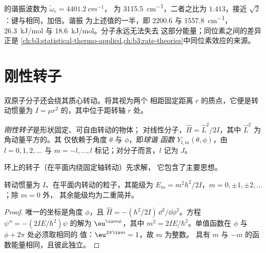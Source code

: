 \begin{example}[\ce{H2} 与 \ce{D2} 的零点能]\label{ex:b3:quantum-model-systems:zpe}
 的谐振波数为 $\tilde\omega_e = \qty{4401.2}{cm^{-1}}$，
 为 \qty{3115.5}{cm^{-1}}，二者之比为 $1.413$，接近
$\sqrt2$：键与相同，加倍。谐振
为上述值的一半，即 2200.6 与 \qty{1557.8}{cm^{-1}}，
\qty{26.3}{kJ/mol} 与 \qty{18.6}{kJ/mol}。分子永远无法失去
这部分能量；同位素之间的差异正是
\cref{ch:b3:statistical-thermo-applied,ch:b3:rate-theories}中同位素效应的来源。
\end{example}

\section{刚性转子}

双原子分子还会绕其质心转动。将其视为两个
相距固定距离 $r$ 的质点，它便是转动惯量为
$I = \mu r^2$ 的，其中位于距转轴 $r$ 处。

\begin{definition}\label{def:b3:quantum-model-systems:rotor}
\emph{刚性转子}是形状固定、可自由转动的物体；
对线性分子，$\hat H = \hat L^2/2I$，其中 $\hat L^2$ 为
角动量平方的。其
仅依赖于角度 $\theta$ 与 $\phi$，即\emph{球谐
函数} $Y_{l,m}(\theta,\phi)$，由 $l =
0, 1, 2, \dots$ 与 $m = -l, \dots, l$ 标记；对分子而言，$l$ 记为 $J$。
\end{definition}

环上的转子（在平面内绕固定轴转动）先求解，
它包含了主要思想。

\begin{theorem}[环]\label{thm:b3:quantum-model-systems:ring}
转动惯量为 $I$、在平面内转动的粒子，其能级为
$E_m = m^2\hbar^2/2I$，$m = 0, \pm1, \pm2, \dots$；除 $m = 0$ 外，
其余能级均为二重简并。
\end{theorem}

\begin{proof}
唯一的坐标是角度 $\phi$，且 $\hat H = -(\hbar^2/2I)\,
\dd^2/\dd\phi^2$。方程 $\psi'' = -(2IE/\hbar^2)\psi$ 的解为 $\eu^{\iu
m\phi}$，其中 $m^2 = 2IE/\hbar^2$。单值函数在 $\phi$ 与 $\phi + 2\pi$ 处必须取相同的
值：$\eu^{2\pi\iu m} = 1$，故 $m$ 为整数。
具有 $m$ 与 $-m$ 的函数能量相同，且彼此独立。
\end{proof}

